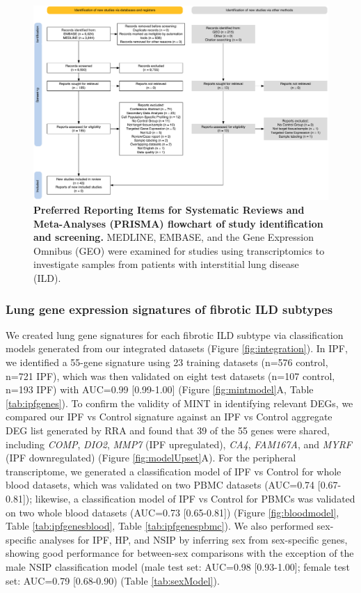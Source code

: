\documentclass[
]{article}
\begin{document}
\begin{figure}

{\centering \includegraphics[width=0.9\linewidth,]{./Figures/SysReview/Figure1_Prisma} 

}

\caption[PRISMA screening]{\textbf{Preferred Reporting Items for Systematic Reviews and Meta-Analyses (PRISMA) flowchart of study identification and screening.} MEDLINE, EMBASE, and the Gene Expression Omnibus (GEO) were examined for studies using transcriptomics to investigate samples from patients with interstitial lung disease (ILD).}\label{fig:prisma}
\end{figure}

\subsubsection{Lung gene expression signatures of fibrotic ILD subtypes}\label{lung-gene-expression-signatures-of-fibrotic-ild-subtypes}

We created lung gene signatures for each fibrotic ILD subtype via classification models generated from our integrated datasets (Figure \ref{fig:integration}). In IPF, we identified a 55-gene signature using 23 training datasets (n=576 control, n=721 IPF), which was then validated on eight test datasets (n=107 control, n=193 IPF) with AUC=0.99 {[}0.99-1.00{]} (Figure \ref{fig:mintmodel}A, Table \ref{tab:ipfgenes}). To confirm the validity of MINT in identifying relevant DEGs, we compared our IPF vs Control signature against an IPF vs Control aggregate DEG list generated by RRA and found that 39 of the 55 genes were shared, including \textit{COMP}, \textit{DIO2}, \textit{MMP7} (IPF upregulated), \textit{CA4}, \textit{FAM167A}, and \textit{MYRF} (IPF downregulated) (Figure \ref{fig:modelUpset}A). For the peripheral transcriptome, we generated a classification model of IPF vs Control for whole blood datasets, which was validated on two PBMC datasets (AUC=0.74 {[}0.67-0.81{]}); likewise, a classification model of IPF vs Control for PBMCs was validated on two whole blood datasets (AUC=0.73 {[}0.65-0.81{]}) (Figure \ref{fig:bloodmodel}, Table \ref{tab:ipfgenesblood}, Table \ref{tab:ipfgenespbmc}). We also performed sex-specific analyses for IPF, HP, and NSIP by inferring sex from sex-specific genes, showing good performance for between-sex comparisons with the exception of the male NSIP classification model (male test set: AUC=0.98 {[}0.93-1.00{]}; female test set: AUC=0.79 {[}0.68-0.90) (Table \ref{tab:sexModel}).
\end{document}
